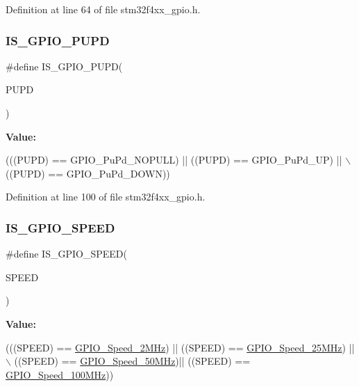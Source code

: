 Definition at line 64 of file stm32f4xx\+\_\+gpio.\+h.

\mbox{\label{group___g_p_i_o_gae30c92591d1f29dbd594ac3cd855b503}} 
\subsubsection{\texorpdfstring{I\+S\+\_\+\+G\+P\+I\+O\+\_\+\+P\+U\+PD}{IS\_GPIO\_PUPD}}
{\footnotesize\ttfamily \#define I\+S\+\_\+\+G\+P\+I\+O\+\_\+\+P\+U\+PD(\begin{DoxyParamCaption}\item[{}]{P\+U\+PD }\end{DoxyParamCaption})}

{\bfseries Value\+:}
\begin{DoxyCode}
(((PUPD) == GPIO\_PuPd\_NOPULL) || ((PUPD) == GPIO\_PuPd\_UP) || \(\backslash\)
                            ((PUPD) == GPIO\_PuPd\_DOWN))
\end{DoxyCode}


Definition at line 100 of file stm32f4xx\+\_\+gpio.\+h.

\mbox{\label{group___g_p_i_o_ga888e1f951df2fe9dbf827528051a3a56}} 
\subsubsection{\texorpdfstring{I\+S\+\_\+\+G\+P\+I\+O\+\_\+\+S\+P\+E\+ED}{IS\_GPIO\_SPEED}}
{\footnotesize\ttfamily \#define I\+S\+\_\+\+G\+P\+I\+O\+\_\+\+S\+P\+E\+ED(\begin{DoxyParamCaption}\item[{}]{S\+P\+E\+ED }\end{DoxyParamCaption})}

{\bfseries Value\+:}
\begin{DoxyCode}
(((SPEED) == \hyperlink{group___g_p_i_o_gga062ad92b67b4a1f301c161022cf3ba8ea9bff9e174639332007c914483361be18}{GPIO\_Speed\_2MHz}) || ((SPEED) == \hyperlink{group___g_p_i_o_gga062ad92b67b4a1f301c161022cf3ba8ea59a0acdf2ccd1b4b8d507e845e497c62}{GPIO\_Speed\_25MHz}) || \(\backslash\)
                              ((SPEED) == \hyperlink{group___g_p_i_o_gga062ad92b67b4a1f301c161022cf3ba8ea9c47db10456202ac05134b12738ce581}{GPIO\_Speed\_50MHz})||  ((SPEED) == 
      \hyperlink{group___g_p_i_o_gga062ad92b67b4a1f301c161022cf3ba8ea195a0e73cd63d7f5b5d41bd0155eacbb}{GPIO\_Speed\_100MHz}))
\end{DoxyCode}


